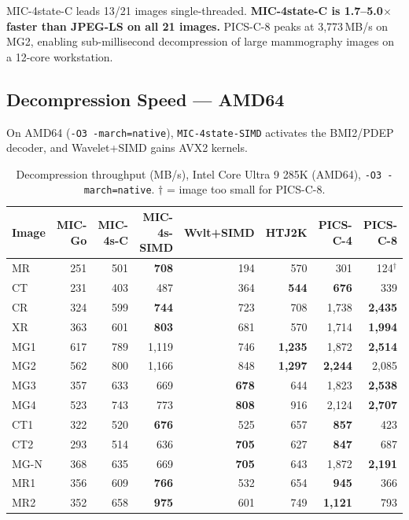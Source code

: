 \documentclass[10pt,twocolumn]{article}
\begin{document}
MIC-4state-C leads 13/21 images single-threaded. \textbf{MIC-4state-C is
1.7--5.0$\times$ faster than JPEG-LS on all 21 images.} PICS-C-8 peaks at
3,773\,MB/s on MG2, enabling sub-millisecond decompression of large mammography
images on a 12-core workstation.

\subsection{Decompression Speed --- AMD64}

On AMD64 (\texttt{-O3 -march=native}), \texttt{MIC-4state-SIMD} activates the
BMI2/PDEP decoder, and Wavelet+SIMD gains AVX2 kernels.

\begin{table}[t]
\centering
\footnotesize
\setlength{\tabcolsep}{4pt}
\caption{Decompression throughput (MB/s), Intel Core Ultra 9 285K (AMD64), \texttt{-O3 -march=native}. $\dagger$ = image too small for PICS-C-8.}
\label{tab:decomp-amd64}
\begin{tabular}{lrrrrrrr}
\toprule
Image & MIC-Go & MIC-4s-C & MIC-4s-SIMD & Wvlt+SIMD & HTJ2K & PICS-C-4 & PICS-C-8 \\
\midrule
MR   & 251 & 501 & \textbf{708} & 194 & 570 & 301 & 124$^\dagger$ \\
CT   & 231 & 403 & 487 & 364 & \textbf{544} & \textbf{676} & 339 \\
CR   & 324 & 599 & \textbf{744} & 723 & 708 & 1,738 & \textbf{2,435} \\
XR   & 363 & 601 & \textbf{803} & 681 & 570 & 1,714 & \textbf{1,994} \\
MG1  & 617 & 789 & 1,119 & 746 & \textbf{1,235} & 1,872 & \textbf{2,514} \\
MG2  & 562 & 800 & 1,166 & 848 & \textbf{1,297} & \textbf{2,244} & 2,085 \\
MG3  & 357 & 633 & 669 & \textbf{678} & 644 & 1,823 & \textbf{2,538} \\
MG4  & 523 & 743 & 773 & \textbf{808} & 916 & 2,124 & \textbf{2,707} \\
CT1  & 322 & 520 & \textbf{676} & 525 & 657 & \textbf{857} & 423 \\
CT2  & 293 & 514 & 636 & \textbf{705} & 627 & \textbf{847} & 687 \\
MG-N & 368 & 635 & 669 & \textbf{705} & 643 & 1,872 & \textbf{2,191} \\
MR1  & 356 & 609 & \textbf{766} & 532 & 654 & \textbf{945} & 366 \\
MR2  & 352 & 658 & \textbf{975} & 601 & 749 & \textbf{1,121} & 793 \\

\end{tabular}
\end{table}
\end{document}
